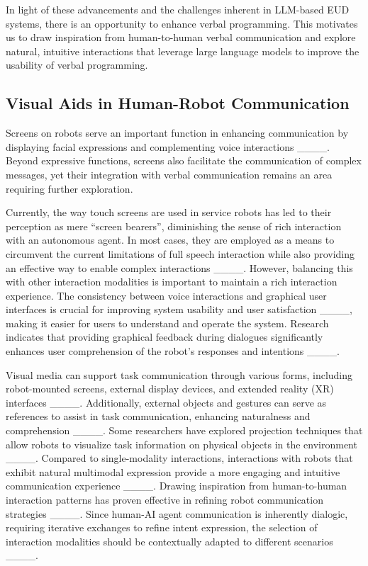 In light of these advancements and the challenges inherent in LLM-based EUD systems, there is an opportunity to enhance verbal programming. This motivates us to draw inspiration from human-to-human verbal communication and explore natural, intuitive interactions that leverage large language models to improve the usability of verbal programming.



 
\subsection{Visual Aids in Human-Robot Communication}



Screens on robots serve an important function in enhancing communication by displaying facial expressions and complementing voice interactions ____. Beyond expressive functions, screens also facilitate the communication of complex messages, yet their integration with verbal communication remains an area requiring further exploration.

Currently, the way touch screens are used in service robots has led to their perception as mere “screen bearers”, diminishing the sense of rich interaction with an autonomous agent.
In most cases, they are employed as a means to circumvent the current limitations of full speech interaction while also providing an effective way to enable complex interactions ____. 
However, balancing this with other interaction modalities is important to maintain a rich interaction experience. The consistency between voice interactions and graphical user interfaces is crucial for improving system usability and user satisfaction ____, making it easier for users to understand and operate the system.
Research indicates that providing graphical feedback during dialogues significantly enhances user comprehension of the robot’s responses and intentions ____.

Visual media can support task communication through various forms, including robot-mounted screens, external display devices, and extended reality (XR) interfaces ____. Additionally, external objects and gestures can serve as references to assist in task communication, enhancing naturalness and comprehension ____. 
Some researchers have explored projection techniques that allow robots to visualize task information on physical objects in the environment ____. 
Compared to single-modality interactions, interactions with robots that exhibit natural multimodal expression provide a more engaging and intuitive communication experience ____. 
Drawing inspiration from human-to-human interaction patterns has proven effective in refining robot communication strategies ____. Since human-AI agent communication is inherently dialogic, requiring iterative exchanges to refine intent expression, the selection of interaction modalities should be contextually adapted to different scenarios ____.





